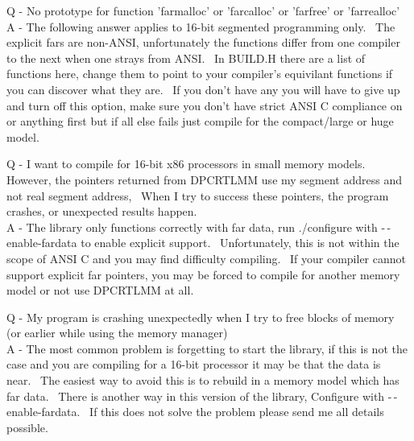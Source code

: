 \documentclass{article}
\begin{document}
\par Q - No prototype for function 'farmalloc' or 'farcalloc' or
'farfree'
or 'farrealloc'
\\
A - The following answer applies to 16-bit segmented programming
only.~ The explicit fars are non-ANSI, unfortunately the functions
differ
from one compiler to the next when one strays from ANSI.~ In
BUILD.H
there are a list of functions here, change them to point to your
compiler's
equivilant functions if you can discover what they are.~ If you
don't
have any you will have to give up and turn off this option, make sure
you
don't have strict ANSI C compliance on or anything first but if all
else
fails just compile for the compact/large or huge model.

\par Q - I want to compile for 16-bit x86 processors in small memory
models.~ However, the pointers returned from DPCRTLMM use my
segment address and not real segment address,~ When I try to
success these pointers, the program crashes, or unexpected results
happen.\\
A - The library only functions correctly with far data, run ./configure
with -$\,$-enable-fardata to enable explicit support.~ Unfortunately,
this is not within the scope of ANSI C and you may find difficulty
compiling.~ If your compiler cannot support explicit far pointers,
you may be forced to compile for another memory model or not use
DPCRTLMM at all.\\

\par Q - My program is crashing unexpectedly when I try to free blocks of
memory (or earlier while using the memory manager)
\\
A - The most common problem is forgetting to start the library, if
this is not the case and you are compiling for a 16-bit processor it
may
be that the data is near.~ The easiest way to avoid this is to
rebuild
in a memory model which has far data.~ There is another way in
this
version of the library, Configure with -$\,$-enable-fardata.~ If this
does not solve
the problem please send me all details possible.
\\
\end{document}
